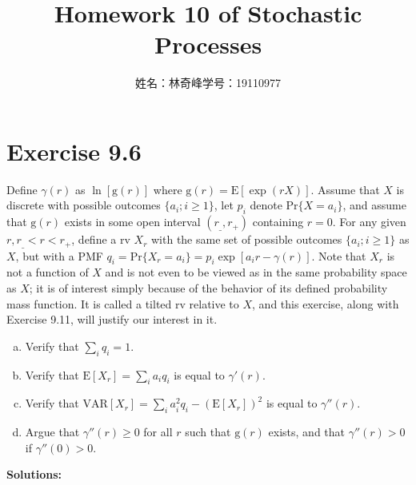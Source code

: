 \documentclass{article}
\begin{document}
    \title{Homework 10 of Stochastic Processes}
    \author{姓名：林奇峰\qquad 学号：19110977}
    \maketitle

    \section{Exercise 9.6}
    Define $\gamma(r)$ as $\ln[\text{g}(r)]$ where $\text{g}(r)=\text{E}[\exp(rX)]$. Assume that $X$ is discrete with possible outcomes $\{a_i;i\geq1\}$, let $p_i$ denote $\text{Pr}\{X=a_i\}$, and assume that $\text{g}(r)$ exists in some open interval $(r_\_,r_+)$ containing $r=0$. For any given $r,r_\_<r<r_+$, define a rv $X_r$ with the same set of possible outcomes $\{a_i;i\geq1\}$ as $X$, but with a PMF $q_i=\text{Pr}\{X_r=a_i\}=p_i\exp[a_ir-\gamma(r)]$. Note that $X_r$ is not a function of $X$ and is not even to be viewed as in the same probability space as $X$; it is of interest simply because of the behavior of its defined probability mass function. It is called a tilted rv relative to $X$, and this exercise, along with Exercise 9.11, will justify our interest in it.
    \begin{enumerate}[(a)]
        \item Verify that $\sum_iq_i=1$.
        \item Verify that $\text{E}[X_r]=\sum_ia_iq_i$ is equal to $\gamma'(r)$.
        \item Verify that $\text{VAR}[X_r]=\sum_ia_i^2q_i-(\text{E}[X_r])^2$ is equal to $\gamma''(r)$.
        \item Argue that $\gamma''(r)\geq0$ for all $r$ such that $\text{g}(r)$ exists, and that $\gamma''(r)>0$ if $\gamma''(0)>0$.
    \end{enumerate}
    \textbf{Solutions:}
\end{document}
